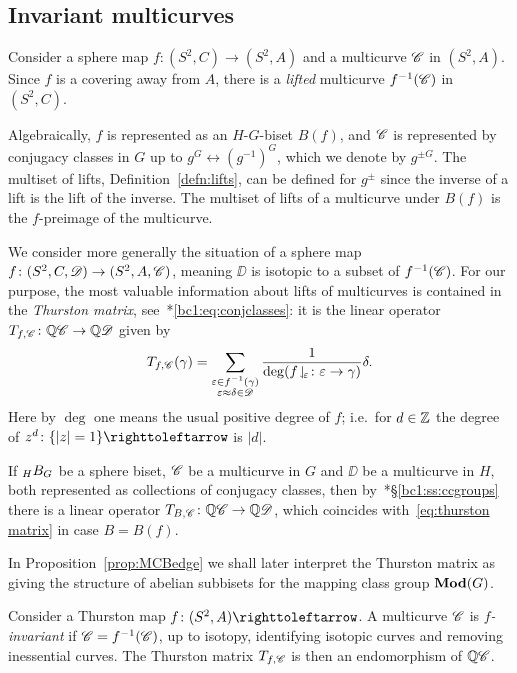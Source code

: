 \documentclass{amsart}
\begin{document}
\subsection{Invariant multicurves}\label{ss:invariant mc}
Consider a sphere map $f\colon(S^2,C)\to(S^2,A)$ and a multicurve
${\mathscr C}$ in $(S^2,A)$. Since $f$ is a covering away from $A$, there is a
\emph{lifted} multicurve $f^{-1}({\mathscr C})$ in $(S^2,C)$.

Algebraically, $f$ is represented as an $H$-$G$-biset $B(f)$, and
${\mathscr C}$ is represented by conjugacy classes in $G$ up to
$g^G\leftrightarrow (g^{-1})^G$, which we denote by $g^{\pm G}$. The
multiset of lifts, Definition~\ref{defn:lifts}, can be defined for
$g^{\pm}$ since the inverse of a lift is the lift of the inverse. The
multiset of lifts of a multicurve under $B(f)$ is the $f$-preimage of
the multicurve.

We consider more generally the situation of a sphere map
$f\colon(S^2,C,{\mathscr D})\to(S^2,A,{\mathscr C})$, meaning $\DD$ is isotopic to a
subset of $f^{-1}({\mathscr C})$. For our purpose, the most valuable
information about lifts of multicurves is contained in the
\emph{Thurston matrix},
see~\cite{bartholdi-dudko:bc1}*{\eqref{bc1:eq:conjclasses}}: it is the
linear operator $T_{f,{\mathscr C}}\colon{\mathbb Q}{\mathscr C}\to{\mathbb Q}{\mathscr D}$ given by
\begin{equation}\label{eq:thurston matrix}
  T_{f,{\mathscr C}}(\gamma)=\sum_{\substack{\varepsilon\in
      f^{-1}(\gamma)\\\varepsilon\approx\delta\in{\mathscr D}}}\frac1{\deg(f\!\downharpoonleft_{\!\varepsilon}\colon\varepsilon\to\gamma)}\delta.
\end{equation}
Here by $\deg$ one means the usual positive degree of $f$; i.e.\ for
$d\in{\mathbb Z}$ the degree of $z^d\colon\{|z|=1\}\selfmap$ is $|d|$.

If $\subscript H B_G$ be a sphere biset, ${\mathscr C}$ be a multicurve in $G$
and $\DD$ be a multicurve in $H$, both represented as collections of
conjugacy classes, then
by~\cite{bartholdi-dudko:bc1}*{\S\ref{bc1:ss:ccgroups}} there is a
linear operator $T_{B,{\mathscr C}}\colon{\mathbb Q}{\mathscr C}\to{\mathbb Q}{\mathscr D}$, which coincides
with~\eqref{eq:thurston matrix} in case $B=B(f)$.

In Proposition~\ref{prop:MCBedge} we shall later interpret the
Thurston matrix as giving the structure of abelian subbisets for the
mapping class group $\mathbf{\relax Mod}(G)$.

Consider a Thurston map $f\colon(S^2,A)\selfmap$. A multicurve ${\mathscr C}$
is \emph{$f$-invariant} if ${\mathscr C}=f^{-1}({\mathscr C})$, up to isotopy,
identifying isotopic curves and removing inessential curves. The
Thurston matrix $T_{f,{\mathscr C}}$ is then an endomorphism of ${\mathbb Q}{\mathscr C}$.
\end{document}
